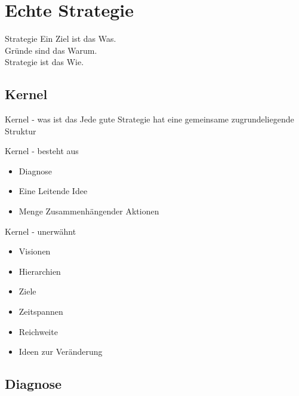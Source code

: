 \section{Echte Strategie}

\begin{frame}[c]{Strategie}
    \Large
    Ein Ziel ist das Was. \\
    Gründe sind das Warum. \\
    \pause
    Strategie ist das Wie.
\end{frame}


\subsection{Kernel}


\begin{frame}[c]{Kernel - was ist das}
    \large
    Jede gute Strategie hat eine gemeinsame zugrundeliegende Struktur
\end{frame}


\begin{frame}[c]{Kernel - besteht aus}
    \Large
    \begin{itemize}
        \item Diagnose
            \pause
        \item Eine Leitende Idee
            \pause
        \item Menge Zusammenhängender Aktionen
    \end{itemize}
\end{frame}


\begin{frame}[c]{Kernel - unerwähnt}
    \begin{itemize}
        \item Visionen
        \item Hierarchien
            \pause
        \item Ziele
        \item Zeitspannen
            \pause
        \item Reichweite
        \item Ideen zur Veränderung
    \end{itemize}
\end{frame}


\subsection{Diagnose}


